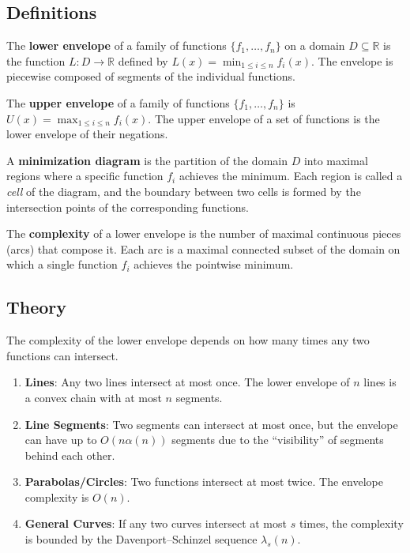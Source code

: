 \subsection{Definitions}

\begin{definition}\label{def:lower_envelope}
The \textbf{lower envelope} of a family of functions $\{f_1, \dots, f_n\}$ on a domain $D \subseteq \mathbb{R}$ is the function $L: D \to \mathbb{R}$ defined by $L(x) = \min_{1 \leq i \leq n} f_i(x)$. The envelope is piecewise composed of segments of the individual functions.
\end{definition}

\begin{definition}\label{def:upper_envelope}
The \textbf{upper envelope} of a family of functions $\{f_1, \dots, f_n\}$ is $U(x) = \max_{1 \leq i \leq n} f_i(x)$. The upper envelope of a set of functions is the lower envelope of their negations.
\end{definition}

\begin{definition}\label{def:minimization_diagram}
A \textbf{minimization diagram} is the partition of the domain $D$ into maximal regions where a specific function $f_i$ achieves the minimum. Each region is called a \emph{cell} of the diagram, and the boundary between two cells is formed by the intersection points of the corresponding functions.
\end{definition}

\begin{definition}\label{def:envelope_complexity}
The \textbf{complexity} of a lower envelope is the number of maximal continuous pieces (arcs) that compose it. Each arc is a maximal connected subset of the domain on which a single function $f_i$ achieves the pointwise minimum.
\end{definition}

\subsection{Theory}
The complexity of the lower envelope depends on how many times any two functions can intersect.
\begin{enumerate}
    \item \textbf{Lines}: Any two lines intersect at most once. The lower envelope of $n$ lines is a convex chain with at most $n$ segments.
    \item \textbf{Line Segments}: Two segments can intersect at most once, but the envelope can have up to $O(n \alpha(n))$ segments due to the ``visibility'' of segments behind each other.
    \item \textbf{Parabolas/Circles}: Two functions intersect at most twice. The envelope complexity is $O(n)$.
    \item \textbf{General Curves}: If any two curves intersect at most $s$ times, the complexity is bounded by the Davenport--Schinzel sequence $\lambda_s(n)$.
\end{enumerate}

